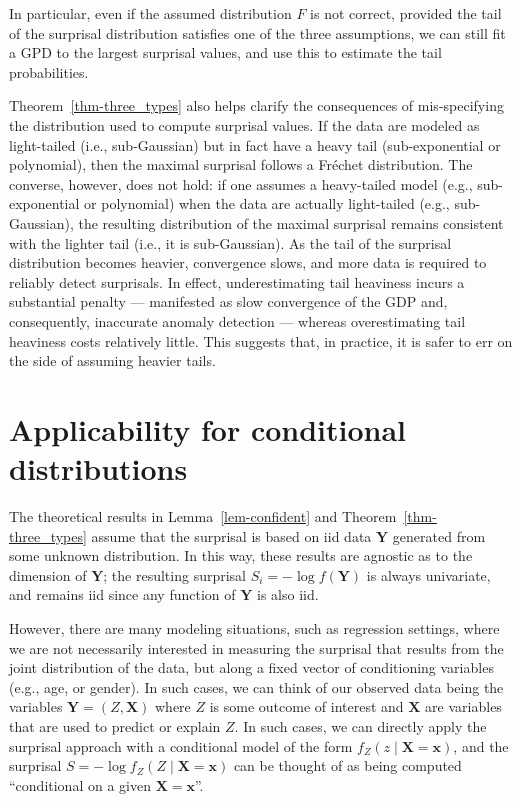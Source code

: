 \documentclass[
  12pt]{article}
\theoremstyle{definition}
\theoremstyle{plain}
\theoremstyle{plain}
\theoremstyle{plain}
\theoremstyle{remark}
\begin{document}
In particular, even if the assumed distribution \(F\) is not correct,
provided the tail of the surprisal distribution satisfies one of the
three assumptions, we can still fit a GPD to the largest surprisal
values, and use this to estimate the tail probabilities.

Theorem~\ref{thm-three_types} also helps clarify the consequences of
mis-specifying the distribution used to compute surprisal values. If the
data are modeled as light-tailed (i.e., sub-Gaussian) but in fact have a
heavy tail (sub-exponential or polynomial), then the maximal surprisal
follows a Fréchet distribution. The converse, however, does not hold: if
one assumes a heavy-tailed model (e.g., sub-exponential or polynomial)
when the data are actually light-tailed (e.g., sub-Gaussian), the
resulting distribution of the maximal surprisal remains consistent with
the lighter tail (i.e., it is sub-Gaussian). As the tail of the
surprisal distribution becomes heavier, convergence slows, and more data
is required to reliably detect surprisals. In effect, underestimating
tail heaviness incurs a substantial penalty --- manifested as slow
convergence of the GDP and, consequently, inaccurate anomaly detection
--- whereas overestimating tail heaviness costs relatively little. This
suggests that, in practice, it is safer to err on the side of assuming
heavier tails.

\section{Applicability for conditional
distributions}\label{sec-conditional}

The theoretical results in Lemma~\ref{lem-confident} and
Theorem~\ref{thm-three_types} assume that the surprisal is based on iid
data \(\bm{Y}\) generated from some unknown distribution. In this way,
these results are agnostic as to the dimension of \(\bm{Y}\); the
resulting surprisal \(S_i=-\log f(\bm{Y})\) is always univariate, and
remains iid since any function of \(\bm{Y}\) is also iid.

However, there are many modeling situations, such as regression
settings, where we are not necessarily interested in measuring the
surprisal that results from the joint distribution of the data, but
along a fixed vector of conditioning variables (e.g., age, or gender).
In such cases, we can think of our observed data being the variables
\(\bm{Y}=(Z,\bm{X})\) where \(Z\) is some outcome of interest and
\(\bm{X}\) are variables that are used to predict or explain \(Z\). In
such cases, we can directly apply the surprisal approach with a
conditional model of the form \(f_Z(z\mid \bm{X}=\bm{x})\), and the
surprisal \(S=-\log f_Z(Z\mid \bm{X}=\bm{x})\) can be thought of as
being computed ``conditional on a given \(\bm{X}=\bm{x}\)''.
\end{document}
